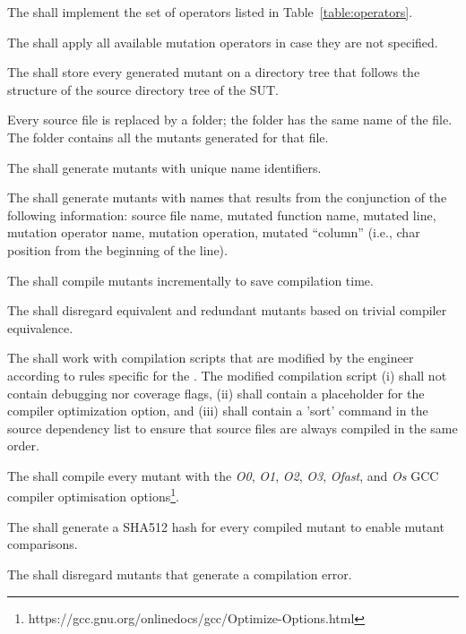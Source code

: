 \RQ{} The \FAQAS shall implement the set of operators listed in Table~\ref{table:operators}.



\RQ{} The \FAQAS shall apply all available mutation operators in case they are not specified.

\RQ{} The \FAQAS shall store every generated mutant on a directory tree that follows the structure of the source directory tree of the SUT.

\remark Every source file is replaced by a folder; the folder has the same name of the file. The folder contains all the mutants generated for that file. 

\RQ{} The \FAQAS shall generate mutants with unique name identifiers.

\RQ{} The \FAQAS shall generate mutants with names that results from the conjunction of the following information:
source file name, mutated function name, mutated line, mutation operator name, mutation operation, mutated ``column'' (i.e., char position from the beginning of the line).

\RQ{} The \FAQAS shall compile mutants incrementally to save compilation time.

\RQ{} The \FAQAS shall disregard equivalent and redundant mutants based on trivial compiler equivalence.

\RQ{} The \FAQAS shall work with compilation scripts that are modified by the engineer according to rules specific for the \FAQAS. 
The modified compilation script (i) shall not contain debugging nor coverage flags, (ii) shall contain a placeholder for the compiler optimization option, and (iii) shall contain a 'sort' command in the source dependency list to ensure that source files are always compiled in the same order.

\RQ{} The \FAQAS shall compile every mutant with the \textit{O0}, \textit{O1}, \textit{O2}, \textit{O3}, \textit{Ofast}, and \textit{Os} GCC compiler optimisation options\footnote{https://gcc.gnu.org/onlinedocs/gcc/Optimize-Options.html}.

\RQ{} The \FAQAS shall generate a SHA512 hash for every compiled mutant to enable mutant comparisons. 

\RQ{} The \FAQAS shall disregard mutants that generate a compilation error.

